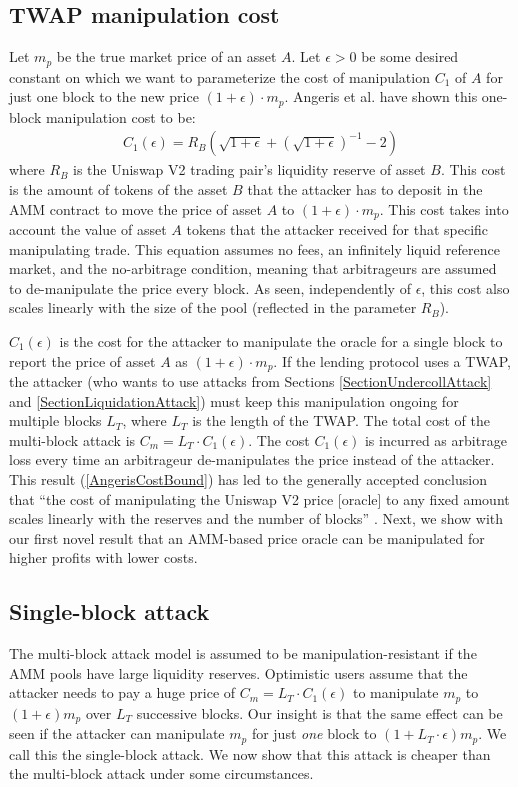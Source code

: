 \subsection{TWAP manipulation cost}
Let $m_p$ be the true market price of an asset $A$. Let $\epsilon > 0$ be some desired constant on which we want to parameterize the cost of manipulation $C_1$ of $A$ for just one block to the new price $(1+\epsilon)\cdot m_p$. Angeris et al. \cite{angeris2019uniswap} have shown this one-block manipulation cost to be:
\begin{align}
    C_1 (\epsilon) = R_B(\sqrt{1+\epsilon} + (\sqrt{1+\epsilon})^{-1} -2)
    \label{AngerisCostBound}
\end{align}
where $R_B$ is the Uniswap V2 trading pair's liquidity reserve of asset $B$. This cost is the amount of tokens of the asset $B$ that the attacker has to deposit in the AMM contract to move the price of asset $A$ to $(1+\epsilon)\cdot m_p$. This cost takes into account the value of asset $A$ tokens that the attacker received for that specific manipulating trade. This equation assumes no fees, an infinitely liquid reference market, and the no-arbitrage condition, meaning that arbitrageurs are assumed to de-manipulate the price every block. As seen, independently of $\epsilon$, this cost also scales linearly with the size of the pool (reflected in the parameter $R_B$).

$C_1 (\epsilon)$ is the cost for the attacker to manipulate the oracle for a single block to report the price of asset $A$ as $(1+\epsilon)\cdot m_p$. If the lending protocol uses a TWAP, the attacker (who wants to use attacks from Sections \ref{SectionUndercollAttack} and \ref{SectionLiquidationAttack}) must keep this manipulation ongoing for multiple blocks $L_T$, where $L_T$ is the length of the TWAP. The total cost of the multi-block attack is $C_m = L_T \cdot C_1 (\epsilon)$. The cost $C_1(\epsilon)$ is incurred as arbitrage loss every time an arbitrageur de-manipulates the price instead of the attacker. This result (\ref{AngerisCostBound}) has led to the generally accepted conclusion that ``the cost of manipulating the Uniswap V2 price [oracle] to any fixed amount scales linearly with the reserves and the number of blocks'' \cite{AngerisMedium}. Next, we show with our first novel result that an AMM-based price oracle can be manipulated for higher profits with lower costs.

\subsection{Single-block attack}
The multi-block attack model is assumed to be manipulation-resistant if the AMM pools have large liquidity reserves. Optimistic users assume that the attacker needs to pay a huge price of $C_m = L_T \cdot C_1(\epsilon)$ to manipulate $m_p$ to $(1+\epsilon)m_p$ over $L_T$ successive blocks. Our insight is that the same effect can be seen if the attacker can manipulate $m_p$ for just \textit{one} block to $(1 + L_T \cdot \epsilon) m_p$. We call this the single-block attack. We now show that this attack is cheaper than the multi-block attack under some circumstances.

